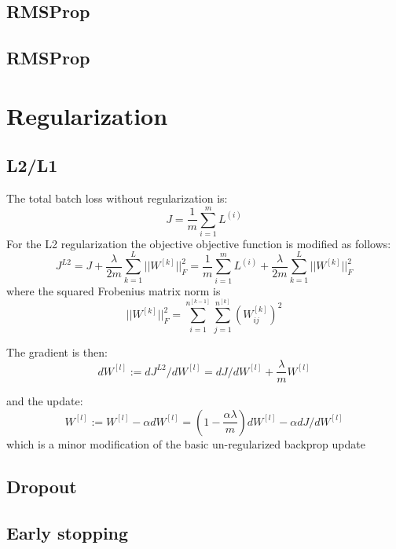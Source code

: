 \documentclass[10pt,a4paper]{article}
\begin{document}
\subsection{RMSProp}

\subsection{RMSProp}



\section{Regularization}

\subsection{L2/L1}
The total batch loss without regularization is:
\[  J = \frac{1}{m} \sum_{i=1}^{m} L^{(i)}     \]
For the L2 regularization the objective  objective function is modified as follows:
\[  J^{L2} =  J + \frac{\lambda}{2m} \sum_{k=1}^L ||W^{[k]}||_F^2 = \frac{1}{m} \sum_{i=1}^{m} L^{(i)} + \frac{\lambda}{2m} \sum_{k=1}^L ||W^{[k]}||_F^2     \]
where the squared Frobenius matrix norm is 
\[  ||W^{[k]}||_F^2 = \sum_{i=1}^{n^{[k-1]}} \sum_{j=1}^{n^{[k]}} (W^{[k]}_{ij})^2     \]

The gradient is then:
\[  dW^{[l]} := dJ^{L2}/ dW^{[l]} =  dJ/ dW^{[l]}  + \frac{\lambda}{m} W^{[l]}    \]

and the update:
\[  W^{[l]}:= W^{[l]} - \alpha  dW^{[l]}  = (1-\frac{\alpha \lambda}{m}  ) dW^{[l]}  -   \alpha dJ/ dW^{[l]}      \]
which is a minor modification of the basic un-regularized  backprop update 

\subsection{Dropout}

\subsection{Early stopping} 









\end{document}
